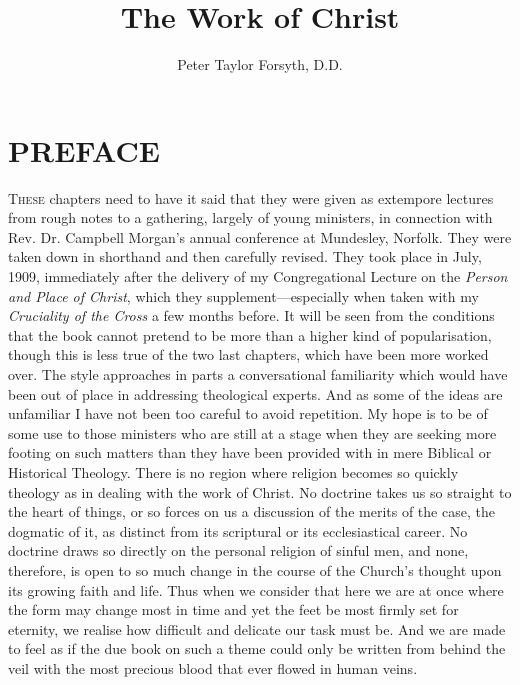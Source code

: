 \documentclass[12pt,letterpaper,oneside]{book}
\author{Peter Taylor Forsyth, D.D.}
\title{The Work of Christ}
\begin{document}
\maketitle




\chapter*{PREFACE} 


\textsc{These} chapters need to have it said that 
they were given as extempore lectures 
from rough notes to a gathering, largely of 
young ministers, in connection with Rev. 
Dr. Campbell Morgan's annual conference at 
Mundesley, Norfolk. They were taken down 
in shorthand and then carefully revised. They 
took place in July, 1909, immediately after 
the delivery of my Congregational Lecture on 
the \textit{Person and Place of Christ}, which they 
supplement---especially when taken with my 
\textit{Cruciality of the Cross} a few months before. 
It will be seen from the conditions that the 
book cannot pretend to be more than a 
higher kind of popularisation, though this is 
less true of the two last chapters, which 
have been more worked over. The style approaches 
in parts a conversational familiarity 
which would have been out of place in addressing 
theological experts. And as some of the 
ideas are unfamiliar I have not been too careful 
to avoid repetition. My hope is to be of some 
use to those ministers who are still at a 
stage when they are seeking more footing on 
such matters than they have been provided 
with in mere Biblical or Historical Theology. 
There is no region where religion becomes so 
quickly theology as in dealing with the work 
of Christ. No doctrine takes us so straight 
to the heart of things, or so forces on us a 
discussion of the merits of the case, the dogmatic 
of it, as distinct from its scriptural or 
its ecclesiastical career. No doctrine draws so 
directly on the personal religion of sinful men, 
and none, therefore, is open to so much change 
in the course of the Church's thought upon its 
growing faith and life. Thus when we consider 
that here we are at once where the form may 
change most in time and yet the feet be most 
firmly set for eternity, we realise how difficult 
and delicate our task must be. And we are 
made to feel as if the due book on such a 
theme could only be written from behind the 
veil with the most precious blood that ever 
flowed in human veins. 
\end{document}
